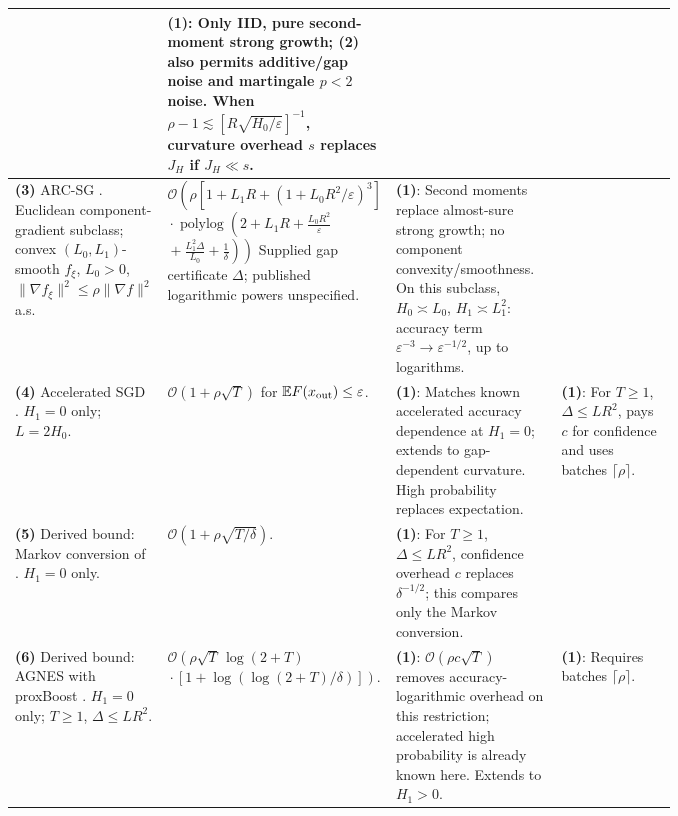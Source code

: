 \begin{table}[tp]
\begin{threeparttable}
\begin{tabularx}{\linewidth}{@{}>{\raggedright\arraybackslash}p{0.20\linewidth}>{\raggedright\arraybackslash}p{0.32\linewidth}>{\raggedright\arraybackslash}p{0.25\linewidth}>{\raggedright\arraybackslash}X@{}}
& \textbf{(1)}: Only IID, pure second-moment strong growth; \textbf{(2)} also permits additive/gap noise and martingale $p<2$ noise. When $\rho-1\lesssim [R\sqrt{H_0/\varepsilon}]^{-1}$, curvature overhead $s$ replaces $J_H$ if $J_H\ll s$. \\
\midrule
\textbf{(3)} ARC-SG \citep[App.~I, Thm.~7, v1]{gssgDvinskikh2026v1}. Euclidean component-gradient subclass; convex $(L_0,L_1)$-smooth $f_\xi$, $L_0>0$, $\|\nabla f_\xi\|^2\le\rho\|\nabla f\|^2$ a.s.
& $\mathcal{O}\!\left(\rho\left[1+L_1R+(1+L_0R^2/\varepsilon)^3\right]\right.$\newline
$\left.{}\cdot\operatorname{polylog}\!\left(2+L_1R+\frac{L_0R^2}{\varepsilon}\right.\right.$\newline $\left.\left.{}+\frac{L_1^2\Delta}{L_0}+\frac1\delta\right)\right)$\newline
Supplied gap certificate $\Delta$; published logarithmic powers unspecified.
& \textbf{(1)}: Second moments replace almost-sure strong growth; no component convexity/smoothness. On this subclass, $H_0\asymp L_0$, $H_1\asymp L_1^2$: accuracy term $\varepsilon^{-3}\to\varepsilon^{-1/2}$, up to logarithms.
& \\
\midrule
\textbf{(4)} Accelerated SGD \citep[Thm.~2]{gssgVaswani2019}. $H_1=0$ only; $L=2H_0$.
& $\mathcal{O}(1+\rho\sqrt T)$ for $\mathbb{E}F(x_{\rm out})\le\varepsilon$.
& \textbf{(1)}: Matches known accelerated accuracy dependence at $H_1=0$; extends to gap-dependent curvature. High probability replaces expectation.
& \textbf{(1)}: For $T\ge1$, $\Delta\le LR^2$, pays $c$ for confidence and uses batches $\lceil\rho\rceil$. \\
\midrule
\textbf{(5)} Derived bound: Markov conversion of \citep[Thm.~2]{gssgVaswani2019}. $H_1=0$ only.
& $\mathcal{O}(1+\rho\sqrt{T/\delta})$.
& \textbf{(1)}: For $T\ge1$, $\Delta\le LR^2$, confidence overhead $c$ replaces $\delta^{-1/2}$; this compares only the Markov conversion.
& \\
\midrule
\textbf{(6)} Derived bound: AGNES \citep[Thm.~15, v3]{gssgGupta2025v3} with proxBoost \citep[Thm.~7]{gssgDavis2020}. $H_1=0$ only; $T\ge1$, $\Delta\le LR^2$.
& $\mathcal{O}\!\left(\rho\sqrt T\,\log(2+T)\right.$\newline
$\left.{}\cdot[1+\log(\log(2+T)/\delta)]\right)$.
& \textbf{(1)}: $\mathcal{O}(\rho c\sqrt T)$ removes accuracy-logarithmic overhead on this restriction; accelerated high probability is already known here. Extends to $H_1>0$.
& \textbf{(1)}: Requires batches $\lceil\rho\rceil$. \\

\end{tabularx}
\end{threeparttable}
\end{table}
